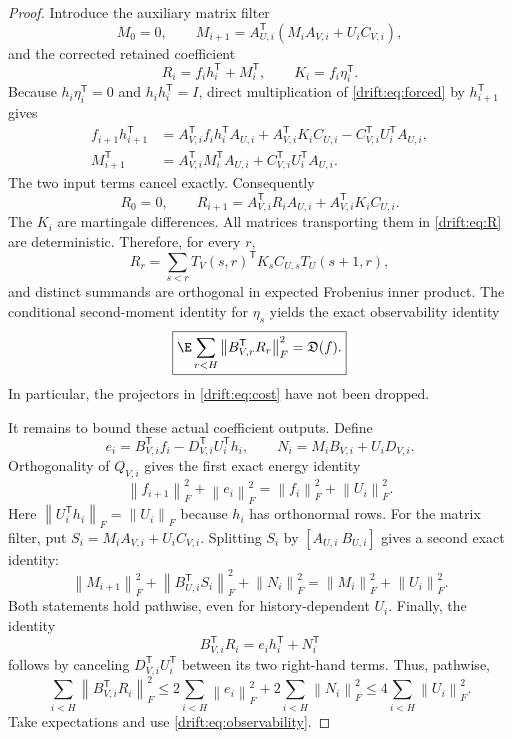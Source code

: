 \documentclass[11pt,oneside,openany,a4paper]{book}
\numberwithin{equation}{chapter}
\theoremstyle{definition}
\theoremstyle{remark}
\newcommand{\T}{\mathsf T}\newcommand{\Id}{I}
\newcommand{\F}[1]{\left\lVert#1\right\rVert_F}
\begin{document}
\begin{proof}
Introduce the auxiliary matrix filter
\begin{equation}\label{drift:eq:M}
 M_0=0,\qquad M_{i+1}=A_{U,i}^\T(M_iA_{V,i}+U_iC_{V,i}),
\end{equation}
and the corrected retained coefficient
\[
 R_i=f_i h_i^\T+M_i^\T,\qquad K_i=f_i\eta_i^\T.
\]
Because $h_i\eta_i^\T=0$ and $h_ih_i^\T=I$, direct multiplication
of \eqref{drift:eq:forced} by $h_{i+1}^\T$ gives
\begin{align*}
 f_{i+1}h_{i+1}^\T
 &=A_{V,i}^\T f_i h_i^\T A_{U,i}
   +A_{V,i}^\T K_iC_{U,i}-C_{V,i}^\T U_i^\T A_{U,i},\\
 M_{i+1}^\T
 &=A_{V,i}^\T M_i^\T A_{U,i}+C_{V,i}^\T U_i^\T A_{U,i}.
\end{align*}
The two input terms cancel exactly. Consequently
\begin{equation}\label{drift:eq:R}
 R_0=0,\qquad
 R_{i+1}=A_{V,i}^\T R_iA_{U,i}+A_{V,i}^\T K_iC_{U,i}.
\end{equation}
The $K_i$ are martingale differences. All matrices transporting them
in \eqref{drift:eq:R} are deterministic. Therefore, for every $r$,
\[
 R_r=\sum_{s<r}T_V(s,r)^\T K_sC_{U,s}T_U(s+1,r),
\]
and distinct summands are orthogonal in expected Frobenius inner product.
The conditional second-moment identity for $\eta_s$ yields the exact
observability identity
\begin{equation}\label{drift:eq:observability}
 \boxed{\E\sum_{r<H}\F{B_{V,r}^\T R_r}^2=\mathfrak D(f).}
\end{equation}
In particular, the projectors in \eqref{drift:eq:cost} have not been dropped.

It remains to bound these actual coefficient outputs. Define
\[
 e_i=B_{V,i}^\T f_i-D_{V,i}^\T U_i^\T h_i,\qquad
 N_i=M_iB_{V,i}+U_iD_{V,i}.
\]
Orthogonality of $Q_{V,i}$ gives the first exact energy identity
\begin{equation}\label{drift:eq:fenergy}
 \F{f_{i+1}}^2+\F{e_i}^2=\F{f_i}^2+\F{U_i}^2.
\end{equation}
Here $\F{U_i^\T h_i}=\F{U_i}$ because $h_i$ has orthonormal rows.
For the matrix filter, put $S_i=M_iA_{V,i}+U_iC_{V,i}$. Splitting
$S_i$ by $[A_{U,i}\ B_{U,i}]$ gives a second exact identity:
\begin{equation}\label{drift:eq:Menergy}
 \F{M_{i+1}}^2+\F{B_{U,i}^\T S_i}^2+\F{N_i}^2
 =\F{M_i}^2+\F{U_i}^2.
\end{equation}
Both statements hold pathwise, even for history-dependent $U_i$.
Finally, the identity
\begin{equation}\label{drift:eq:output}
 B_{V,i}^\T R_i=e_i h_i^\T+N_i^\T
\end{equation}
follows by canceling $D_{V,i}^\T U_i^\T$ between its two right-hand
terms. Thus, pathwise,
\[
 \sum_{i<H}\F{B_{V,i}^\T R_i}^2
 \le2\sum_{i<H}\F{e_i}^2+2\sum_{i<H}\F{N_i}^2
 \le4\sum_{i<H}\F{U_i}^2.
\]
Take expectations and use \eqref{drift:eq:observability}.
\end{proof}
\end{document}
